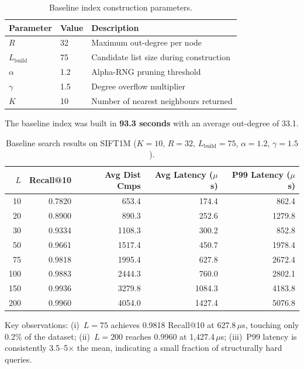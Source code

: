 \documentclass[10pt]{article}
\begin{document}
\begin{table}[H]
\centering
\begin{tabular}{lll}
\toprule
\textbf{Parameter} & \textbf{Value} & \textbf{Description} \\
\midrule
$R$                & 32  & Maximum out-degree per node \\
$L_{\text{build}}$ & 75  & Candidate list size during construction \\
$\alpha$           & 1.2 & Alpha-RNG pruning threshold \\
$\gamma$           & 1.5 & Degree overflow multiplier \\
$K$                & 10  & Number of nearest neighbours returned \\
\bottomrule
\end{tabular}
\caption{Baseline index construction parameters.}
\label{tab:baseline_params}
\end{table}

The baseline index was built in \textbf{93.3 seconds} with an average out-degree of 33.1.

\begin{table}[H]
\centering
\begin{tabular}{rrrrr}
\toprule
\textbf{$L$} & \textbf{Recall@10} & \textbf{Avg Dist Cmps} &
\textbf{Avg Latency ($\mu$s)} & \textbf{P99 Latency ($\mu$s)} \\
\midrule
10  & 0.7820 & 653.4  & 174.4  & 862.4  \\
20  & 0.8900 & 890.3  & 252.6  & 1279.8 \\
30  & 0.9334 & 1108.3 & 300.2  & 852.8  \\
50  & 0.9661 & 1517.4 & 450.7  & 1978.4 \\
75  & 0.9818 & 1995.4 & 627.8  & 2672.4 \\
100 & 0.9883 & 2444.3 & 760.0  & 2802.1 \\
150 & 0.9936 & 3279.8 & 1084.3 & 4183.8 \\
200 & 0.9960 & 4054.0 & 1427.4 & 5076.8 \\
\bottomrule
\end{tabular}
\caption{Baseline search results on SIFT1M ($K=10$, $R=32$, $L_{\text{build}}=75$, $\alpha=1.2$, $\gamma=1.5$).}
\label{tab:baseline_results}
\end{table}

Key observations: (i)~$L=75$ achieves 0.9818 Recall@10 at 627.8\,$\mu$s, touching only 0.2\% of the dataset; (ii)~$L=200$ reaches 0.9960 at 1,427.4\,$\mu$s; (iii)~P99 latency is consistently 3.5--5$\times$ the mean, indicating a small fraction of structurally hard queries.
\end{document}
